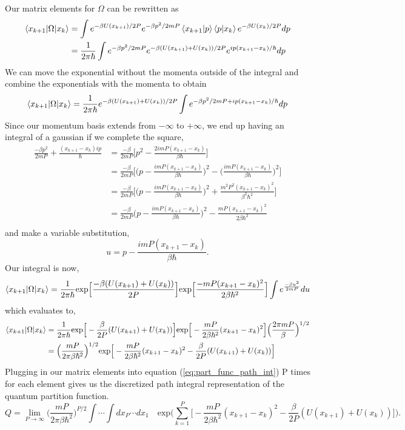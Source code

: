 \documentclass{article}
\newcommand{\be}{\begin{equation}}
\newcommand{\ee}{\end{equation}}
\begin{document}
Our matrix elements for $\Omega$ can be rewritten as
\be
  \begin{split}
    \braket{x_{k+1}|\Omega|x_k} &= \int e^{-\beta U(x_{k+1})/2P} e^{-\beta p^2/2mP} \braket{x_{k+1}|p}\braket{p|x_k} e^{-\beta U(x_k)/2P} dp \\
    &= \frac{1}{2 \pi \hbar} \int e^{-\beta p^2/2mP} e^{-\beta(U(x_{k+1}) + U(x_k))/2P} e^{ip(x_{k+1} - x_k)/\hbar} dp
  \end{split}
\ee
We can move the exponential without the momenta outside of the integral and combine the exponentials with the momenta to obtain
\be
  \braket{x_{k+1}|\Omega|x_k} = \frac{1}{2 \pi \hbar} e^{-\beta(U(x_{k+1}) + U(x_k))/2P} \int e^{-\beta p^2/2mP + ip(x_{k+1} - x_k)/\hbar} dp
\ee
Since our momentum basis extends from $- \infty$ to $+ \infty$, we end up having an integral of a gaussian if we complete the square,
\be
  \begin{split}
    \frac{- \beta p^2}{2mP} + \frac{(x_{k+1} - x_k)ip}{\hbar} &= \frac{- \beta}{2mP} \Big[ p^2 - \frac{2imP(x_{k+1} - x_k)}{\beta \hbar} \Big] \\
    &= \frac{- \beta}{2mP} \Big[ \Big( p -  \frac{imP(x_{k+1} - x_k)}{\beta \hbar} \Big)^2 - \Big( \frac{imP(x_{k+1} - x_k)}{\beta \hbar} \Big)^2 \Big] \\
    &= \frac{- \beta}{2mP} \Big[ \Big( p -  \frac{imP(x_{k+1} - x_k)}{\beta \hbar} \Big)^2 + \frac{m^2P^2(x_{k+1} - x_k)^2}{\beta^2 \hbar^2} \Big] \\
    &= \frac{- \beta}{2mP} \Big( p -  \frac{imP(x_{k+1} - x_k)}{\beta \hbar} \Big)^2 - \frac{mP(x_{k+1} - x_k)^2}{2 \beta \hbar^2} \\
  \end{split}
\ee
and make a variable substitution,
\be
  u = p -  \frac{imP(x_{k+1} - x_k)}{\beta \hbar} .
\ee
Our integral is now,
\be
  \braket{x_{k+1}|\Omega|x_k} = \frac{1}{2 \pi \hbar} \text{exp} \Big[ \frac{-\beta(U(x_{k+1}) + U(x_k))}{2P} \Big] \text{exp} \Big[ \frac{-mP(x_{k+1} - x_k)^2}{2 \beta \hbar^2} \Big] \int e^\frac{-\beta u^2}{2mP} du
\ee
which evaluates to,
\be
  \begin{split}
    \braket{x_{k+1}|\Omega|x_k} &= \frac{1}{2 \pi \hbar} \text{exp} \Big[ -\frac{\beta}{2P}(U(x_{k+1}) + U(x_k)) \Big] \text{exp} \Big[ -\frac{mP}{2 \beta \hbar^2}(x_{k+1} - x_k)^2 \Big] \Big( \frac{2 \pi m P}{\beta} \Big)^{1/2} \\
    &= \Big( \frac{mP}{2 \pi \beta \hbar^2} \Big)^{1/2} \text{exp} \Big[ - \frac{mP}{2 \beta \hbar^2}(x_{k+1} - x_k)^2 - \frac{\beta}{2P}(U(x_{k+1}) + U(x_k)) \Big]
  \end{split}
\ee
Plugging in our matrix elements into equation (\ref{eq:part_func_path_int}) P times for each element gives us the discretized path integral representation of the quantum partition function.
\be \label{eq:part_func_with_omega}
  Q = \lim_{P \to\infty} \Big( \frac{mP}{2 \pi \beta \hbar^2} \Big)^{P/2} \int \cdots \int dx_P \cdots dx_1 \quad \text{exp}\Big( \sum_{k=1}^P \Big[ - \frac{mP}{2 \beta \hbar^2}(x_{k+1} - x_k)^2 - \frac{\beta}{2P}(U(x_{k+1}) + U(x_k)) \Big] \Big) .
\ee
\end{document}
